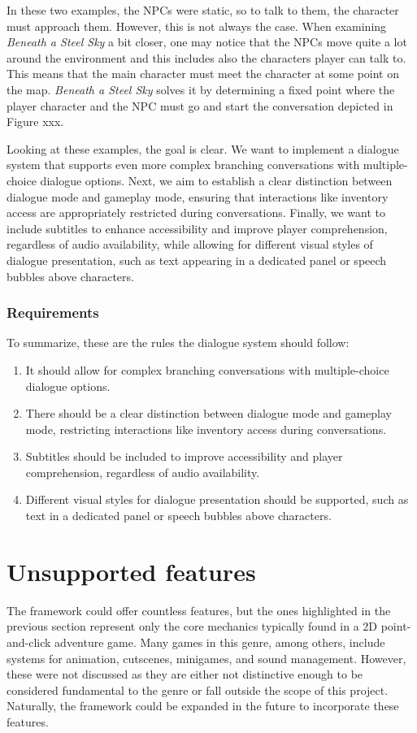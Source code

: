 In these two examples, the NPCs were static, so to talk to them, the character must approach them. However, this is not always the case. When examining \textit{Beneath a Steel Sky} a bit closer, one may notice that the NPCs move quite a lot around the environment and this includes also the characters player can talk to. This means that the main character must meet the character at some point on the map. \textit{Beneath a Steel Sky} solves it by determining a fixed point where the player character and the NPC must go and start the conversation depicted in Figure xxx.

Looking at these examples, the goal is clear. We want to implement a dialogue system that supports even more complex branching conversations with multiple-choice dialogue options. Next, we aim to establish a clear distinction between dialogue mode and gameplay mode, ensuring that interactions like inventory access are appropriately restricted during conversations. Finally, we want to include subtitles to enhance accessibility and improve player comprehension, regardless of audio availability, while allowing for different visual styles of dialogue presentation, such as text appearing in a dedicated panel or speech bubbles above characters. 

\subsubsection{Requirements}
To summarize, these are the rules the dialogue system should follow:

\begin{enumerate}[label=\color{teal}\textbf{R{\arabic*}},resume]
  \item \label{intro:req:multi_dialogue} It should allow for complex branching conversations with multiple-choice dialogue options.
  \item \label{intro:req:modes} There should be a clear distinction between dialogue mode and gameplay mode, restricting interactions like inventory access during conversations.
  \item \label{intro:req:subs} Subtitles should be included to improve accessibility and player comprehension, regardless of audio availability.
  \item \label{intro:req:sub_format} Different visual styles for dialogue presentation should be supported, such as text in a dedicated panel or speech bubbles above characters.
\end{enumerate}

\section{Unsupported features}
The framework could offer countless features, but the ones highlighted in the previous section represent only the core mechanics typically found in a 2D point-and-click adventure game. Many games in this genre, among others, include systems for animation, cutscenes, minigames, and sound management. However, these were not discussed as they are either not distinctive enough to be considered fundamental to the genre or fall outside the scope of this project. Naturally, the framework could be expanded in the future to incorporate these features. 

